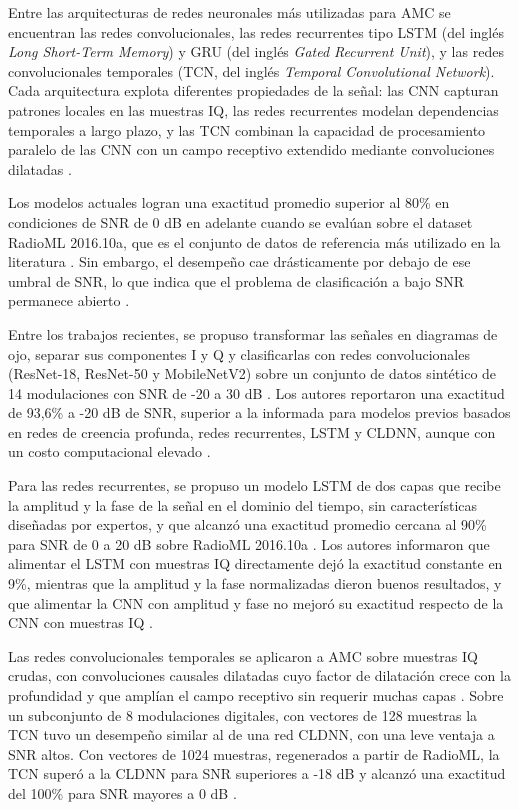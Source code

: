 Entre las arquitecturas de redes neuronales más utilizadas para AMC se encuentran las redes convolucionales, las redes recurrentes tipo LSTM (del inglés \textit{Long Short-Term Memory}) y GRU (del inglés \textit{Gated Recurrent Unit}), y las redes convolucionales temporales (TCN, del inglés \textit{Temporal Convolutional Network}). Cada arquitectura explota diferentes propiedades de la señal: las CNN capturan patrones locales en las muestras IQ, las redes recurrentes modelan dependencias temporales a largo plazo, y las TCN combinan la capacidad de procesamiento paralelo de las CNN con un campo receptivo extendido mediante convoluciones dilatadas \cite{oshea2016convolutional,peng2019modulation,kim2018automatic}.

Los modelos actuales logran una exactitud promedio superior al 80\% en condiciones de SNR de 0 dB en adelante cuando se evalúan sobre el dataset RadioML 2016.10a, que es el conjunto de datos de referencia más utilizado en la literatura \cite{oshea2016convolutional,oshea2018over}. Sin embargo, el desempeño cae drásticamente por debajo de ese umbral de SNR, lo que indica que el problema de clasificación a bajo SNR permanece abierto \cite{oshea2018over}.

Entre los trabajos recientes, se propuso transformar las señales en diagramas de ojo, separar sus componentes I y Q y clasificarlas con redes convolucionales (ResNet-18, ResNet-50 y MobileNetV2) sobre un conjunto de datos sintético de 14 modulaciones con SNR de -20 a 30 dB \cite{rehman2025dlamc}. Los autores reportaron una exactitud de 93,6\% a -20 dB de SNR, superior a la informada para modelos previos basados en redes de creencia profunda, redes recurrentes, LSTM y CLDNN, aunque con un costo computacional elevado \cite{rehman2025dlamc}.

Para las redes recurrentes, se propuso un modelo LSTM de dos capas que recibe la amplitud y la fase de la señal en el dominio del tiempo, sin características diseñadas por expertos, y que alcanzó una exactitud promedio cercana al 90\% para SNR de 0 a 20 dB sobre RadioML 2016.10a \cite{rajendran2018distributed}. Los autores informaron que alimentar el LSTM con muestras IQ directamente dejó la exactitud constante en 9\%, mientras que la amplitud y la fase normalizadas dieron buenos resultados, y que alimentar la CNN con amplitud y fase no mejoró su exactitud respecto de la CNN con muestras IQ \cite{rajendran2018distributed}.

Las redes convolucionales temporales se aplicaron a AMC sobre muestras IQ crudas, con convoluciones causales dilatadas cuyo factor de dilatación crece con la profundidad y que amplían el campo receptivo sin requerir muchas capas \cite{ghasemi2019spectrum}. Sobre un subconjunto de 8 modulaciones digitales, con vectores de 128 muestras la TCN tuvo un desempeño similar al de una red CLDNN, con una leve ventaja a SNR altos. Con vectores de 1024 muestras, regenerados a partir de RadioML, la TCN superó a la CLDNN para SNR superiores a -18 dB y alcanzó una exactitud del 100\% para SNR mayores a 0 dB \cite{ghasemi2019spectrum}.

